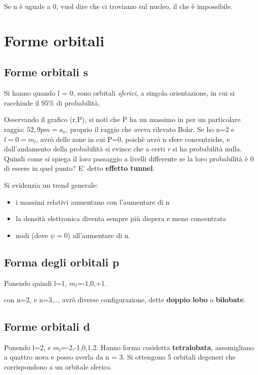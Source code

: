 Se n è uguale a 0, vuol dire che ci troviamo sul nucleo, il che è impossibile. 

\section{Forme orbitali}
\subsection{Forme orbitali s}
Si hanno quando l = 0, sono orbitali \emph{sferici}, a singola orientazione, in cui si racchiude il 95\% di probabilità. 


Osservando il grafico (r,P), si noti che P ha un massimo in per un particolare raggio: $52,9pm=a_o$, proprio il raggio che aveva rilevato Bohr. Se ho n=2 e $l=0=m_l$, avrò delle zone in cui P=0, poichè avrò n sfere concentriche, e dall'andamento della probabilità si evince che a certi \emph{r} si ha probabilità nulla. Quindi come si spiega il loro passaggio a livelli differente se la loro 
probabilità è 0 di essere in quel punto? E' detto \textbf{effetto tunnel}. 

Si evidenzia un trend generale: 
\begin{itemize}
    \item i massimi relativi aumentano con l'aumentare di n 
    \item la densità elettronica diventa sempre più dispera e meno concentrata
    \item nodi (dove $\psi=0$) all'aumentare di n. 
\end{itemize}

\subsection{Forma degli orbitali p}
Ponendo quindi l=1, $m_l$=-1,0,+1. 

con n=2, e n=3,.., avrò diverse configurazione, dette \textbf{doppio lobo} o \textbf{bilobate}.  


\subsection{Forme orbitali d}
Ponendo l=2, e $m_l$=-2,-1,0,1,2. 
Hanno forma cosidetta \textbf{tetralobata}, assomigliano a quattro uova e posso averla da n = 3. Si ottengono 5 orbitali degeneri che corrispondono a un orbitale sferico. 

